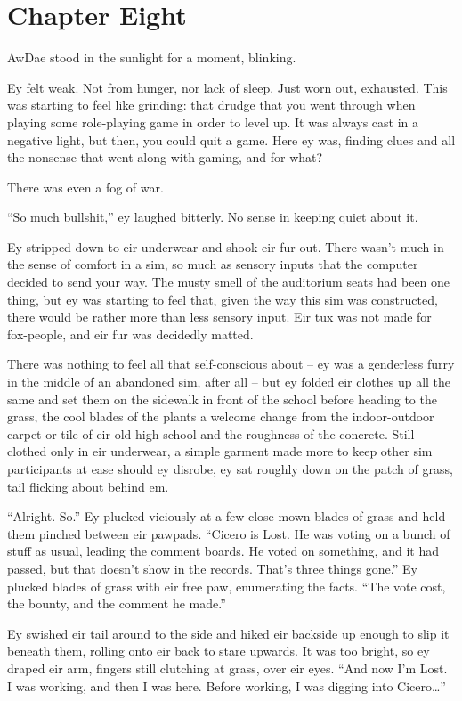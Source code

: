 \chapter*{Chapter Eight}

AwDae stood in the sunlight for a moment, blinking.

Ey felt weak.  Not from hunger, nor lack of sleep.  Just worn out, exhausted.  This was starting to feel like grinding: that drudge that you went through when playing some role-playing game in order to level up.  It was always cast in a negative light, but then, you could quit a game.  Here ey was, finding clues and all the nonsense that went along with gaming, and for what?

There was even a fog of war.

``So much bullshit,''  ey laughed bitterly.  No sense in keeping quiet about it.

Ey stripped down to eir underwear and shook eir fur out.  There wasn't much in the sense of comfort in a sim, so much as sensory inputs that the computer decided to send your way.  The musty smell of the auditorium seats had been one thing, but ey was starting to feel that, given the way this sim was constructed, there would be rather more than less sensory input.  Eir tux was not made for fox-people, and eir fur was decidedly matted.

There was nothing to feel all that self-conscious about -- ey was a genderless furry in the middle of an abandoned sim, after all -- but ey folded eir clothes up all the same and set them on the sidewalk in front of the school before heading to the grass, the cool blades of the plants a welcome change from the indoor-outdoor carpet or tile of eir old high school and the roughness of the concrete.  Still clothed only in eir underwear, a simple garment made more to keep other sim participants at ease should ey disrobe, ey sat roughly down on the patch of grass, tail flicking about behind em.

``Alright.  So.''  Ey plucked viciously at a few close-mown blades of grass and held them pinched between eir pawpads.  ``Cicero is Lost.  He was voting on a bunch of stuff as usual, leading the comment boards.  He voted on something, and it had passed, but that doesn't show in the records.  That's three things gone.''  Ey plucked blades of grass with eir free paw, enumerating the facts.  ``The vote cost, the bounty, and the comment he made.''

Ey swished eir tail around to the side and hiked eir backside up enough to slip it beneath them, rolling onto eir back to stare upwards.  It was too bright, so ey draped eir arm, fingers still clutching at grass, over eir eyes.  ``And now I'm Lost.  I was working, and then I was here.  Before working, I was digging into Cicero\ldots{}''


